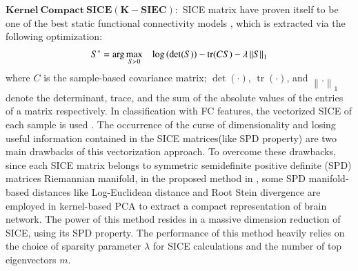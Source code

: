 \documentclass[preprint,12pt]{elsarticle}
\newcommand\norm[1]{\left\lVert#1\right\rVert}
\begin{document}
	
	$\mathbf{Kernel~Compact~SICE(K-SIEC):}$ 
	SICE matrix have proven itself to be one of the best static functional connectivity models \cite{r15,r60,r61,r62, r63}, which is extracted via the following optimization:
	\begin{align}
	S^* = \operatorname{arg} \max\limits_{S\succ 0} \hspace{3mm} \log \left( \det(S) \right) - \operatorname{tr}(CS) - \lambda \norm{S}_1
	\end{align}
	where $C$ is the sample-based covariance matrix; $\det(·)$, $\operatorname{tr}(·)$,
	and $\norm{.}_1$ denote the determinant, trace, and the sum of the absolute values of the entries of a matrix respectively.
	In classification with FC features,  the vectorized SICE of each sample is used \cite{r19}. The occurrence of the curse of dimensionality and losing useful information contained in the SICE matrices(like SPD property) are two main drawbacks of this vectorization approach. To overcome these drawbacks, since each SICE matrix belongs to symmetric semidefinite positive definite (SPD) matrices Riemannian manifold, in the proposed method in \cite{r14},
	some SPD manifold-based distances like Log-Euclidean distance\cite{r49} and Root Stein divergence\cite{r50} are employed in kernel-based PCA to extract a compact representation of brain network. 
	The power of this method resides in a massive dimension reduction of SICE, using its SPD property. The performance of this method heavily relies on the choice of sparsity parameter $\lambda$ for SICE calculations and the number of top eigenvectors $m$. 
	
\end{document}
